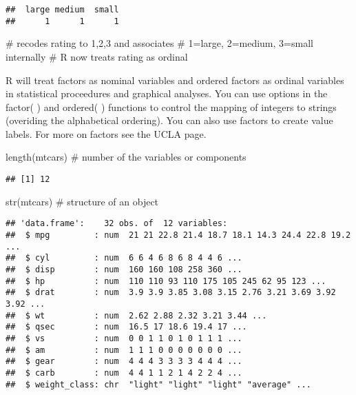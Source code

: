 \documentclass[]{article}
\newenvironment{Shaded}{\begin{snugshade}}{\end{snugshade}}
\newcommand{\KeywordTok}[1]{\textcolor[rgb]{0.94,0.87,0.69}{{#1}}}
\newcommand{\CommentTok}[1]{\textcolor[rgb]{0.50,0.62,0.50}{{#1}}}
\newcommand{\NormalTok}[1]{\textcolor[rgb]{0.80,0.80,0.80}{{#1}}}
\begin{document}
\begin{verbatim}
##  large medium  small 
##      1      1      1
\end{verbatim}

\begin{Shaded}
\begin{Highlighting}[]
\CommentTok{# recodes rating to 1,2,3 and associates}
\CommentTok{# 1=large, 2=medium, 3=small internally}
\CommentTok{# R now treats rating as ordinal}
\end{Highlighting}
\end{Shaded}

R will treat factors as nominal variables and ordered factors as ordinal
variables in statistical proceedures and graphical analyses. You can use
options in the factor( ) and ordered( ) functions to control the mapping
of integers to strings (overiding the alphabetical ordering). You can
also use factors to create value labels. For more on factors see the
UCLA page.

\begin{Shaded}
\begin{Highlighting}[]
\KeywordTok{length}\NormalTok{(mtcars) }\CommentTok{# number of the variables or components}
\end{Highlighting}
\end{Shaded}

\begin{verbatim}
## [1] 12
\end{verbatim}

\begin{Shaded}
\begin{Highlighting}[]
\KeywordTok{str}\NormalTok{(mtcars)    }\CommentTok{# structure of an object }
\end{Highlighting}
\end{Shaded}

\begin{verbatim}
## 'data.frame':    32 obs. of  12 variables:
##  $ mpg         : num  21 21 22.8 21.4 18.7 18.1 14.3 24.4 22.8 19.2 ...
##  $ cyl         : num  6 6 4 6 8 6 8 4 4 6 ...
##  $ disp        : num  160 160 108 258 360 ...
##  $ hp          : num  110 110 93 110 175 105 245 62 95 123 ...
##  $ drat        : num  3.9 3.9 3.85 3.08 3.15 2.76 3.21 3.69 3.92 3.92 ...
##  $ wt          : num  2.62 2.88 2.32 3.21 3.44 ...
##  $ qsec        : num  16.5 17 18.6 19.4 17 ...
##  $ vs          : num  0 0 1 1 0 1 0 1 1 1 ...
##  $ am          : num  1 1 1 0 0 0 0 0 0 0 ...
##  $ gear        : num  4 4 4 3 3 3 3 4 4 4 ...
##  $ carb        : num  4 4 1 1 2 1 4 2 2 4 ...
##  $ weight_class: chr  "light" "light" "light" "average" ...
\end{verbatim}
\end{document}
